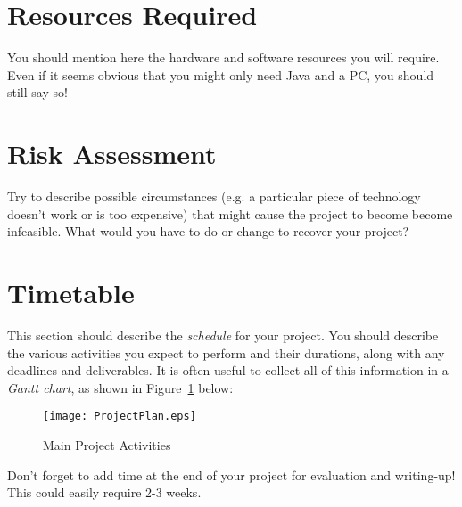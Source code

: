 \documentclass[a4paper,12pt]{article}
\begin{document}
\section*{Resources Required}

You should mention here the hardware and software resources you will
require. Even if it seems obvious that you might only need Java and a PC, 
you should still say so!


\section*{Risk Assessment}

Try to describe possible circumstances (e.g. a particular piece of
technology doesn't work or is too expensive) that might cause
the project to become become infeasible. What would you have to do
or change to recover your project?

\section*{Timetable}

This section should describe the {\em schedule} for your project. 
You should describe the various activities you expect to perform
and their durations, along with any deadlines and deliverables.
It is often useful to collect all of this information in a
{\em Gantt chart}, as shown in Figure~\ref{fig:plan} below:

\begin{figure}[htb]
\begin{center}
\texttt{[image: ProjectPlan.eps]}
\caption{Main Project Activities\label{fig:plan}}
\end{center}
\end{figure}


Don't forget to add time at the end of your project for 
evaluation and writing-up! This could easily require 2-3 weeks.



\end{document}
